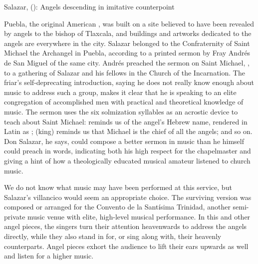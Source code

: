 \begin{musicexample}
    \caption{Salazar, 
    (): Angels descending in imitative counterpoint}
    \label{mus:Salazar-Angelicos_coros-2}
\end{musicexample}

Puebla, the original American , was built on a site
believed to have been revealed by angels to the bishop of Tlaxcala, and
buildings and artworks dedicated to the angels are everywhere in the city.%
    \Autocites
    {AngelContreras:Puebla}
    {Garcia-Castellanos:Puebla-Utopia}
    {Davies:HarmonyConversion}
Salazar belonged to the Confraternity of Saint Michael the Archangel in Puebla,
according to a printed sermon by Fray Andrés de San Miguel of the same city.
Andrés preached the sermon on Saint Michael, , to a gathering of Salazar and his fellows in the Church
of the Incarnation.%
    \Autocite[65--95 ()]{SanMiguel:Sermones}
The friar's self-deprecating introduction, saying he does not really know enough
about music to address such a group, makes it clear that he is speaking to an
elite congregation of accomplished men with practical and theoretical knowledge
of music.
The sermon uses the six solmization syllables as an acrostic device to
teach about Saint Michael:  reminds us of the angel's Hebrew name,
rendered in Latin as ;  (king) reminds us that
Michael is the chief of all the angels; and so on.
Don Salazar, he says, could compose a better sermon in music than he himself
could preach in words, indicating both his high respect for the chapelmaster
and giving a hint of how a theologically educated musical amateur listened to
church music.


We do not know what music may have been performed at this service, but
Salazar's villancico  would seem an appropriate choice.
The surviving version was composed or arranged for the Convento de la Santísima
Trinidad, another semi-private music venue with elite, high-level musical
performance.
In this and other angel pieces, the singers turn their attention heavenwards to
address the angels directly, while they also stand in for, or sing along
with, their heavenly counterparts.
Angel pieces exhort the audience to lift their ears upwards as well and listen
for a higher music.

